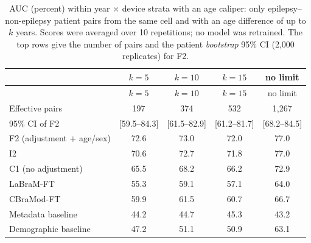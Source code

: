 {\scriptsize
\setlength{\tabcolsep}{4pt}
\begin{longtable}{p{}cccc}
\caption{AUC (percent) within year $\times$ device strata with an age caliper: only epilepsy--non-epilepsy patient pairs from the same cell and with an age difference of up to $k$ years. Scores were averaged over 10 repetitions; no model was retrained. The top rows give the number of pairs and the patient \textit{bootstrap} 95\% CI (2,000 replicates) for F2.}\label{tab:kaliper}\\
\toprule
 & $k=5$ & $k=10$ & $k=15$ & no limit \\
\midrule
\endfirsthead
\toprule
 & $k=5$ & $k=10$ & $k=15$ & no limit \\
\midrule
\endhead
\bottomrule
\endfoot
Effective pairs & 197 & 374 & 532 & 1,267 \\
95\% CI of F2 & [59.5--84.3] & [61.5--82.9] & [61.2--81.7] & [68.2--84.5] \\
\midrule
F2 (adjustment + age/sex) & 72.6 & 73.0 & 72.0 & 77.0 \\
I2 & 70.6 & 72.7 & 71.8 & 77.0 \\
C1 (no adjustment) & 65.5 & 68.2 & 66.2 & 72.9 \\
LaBraM-FT & 55.3 & 59.1 & 57.1 & 64.0 \\
CBraMod-FT & 59.9 & 61.5 & 60.7 & 66.7 \\
Metadata baseline & 44.2 & 44.7 & 45.3 & 43.2 \\
Demographic baseline & 47.2 & 51.1 & 50.9 & 63.1 \\
\end{longtable}
}
